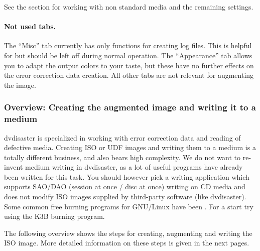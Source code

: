 See the  section
for working with non standard media and the remaining settings. 

\paragraph{Not used tabs.} The ``Misc'' tab currently has only
functions for creating log files. This is helpful for
but should be left off during normal operation.
The ``Appearance'' tab allows you to adapt the output colors
to your taste, but these have no further effects on the error correction data creation.
All other tabs are not relevant for augmenting the image.
 
\subsubsection{Overview: Creating the augmented image and writing it to a medium}
\label{howto-augment-overview}

dvdisaster is specialized in working with error correction data and reading
of defective media. Creating ISO or UDF images and writing them to a medium
is a totally different business, and also bears high complexity. We do not
want to re-invent medium writing in dvdisaster, as a lot of useful programs
have already been written for this task. You should however pick a writing
application which supports SAO/DAO (session at once / disc at once) writing
on CD media and does not modify ISO images supplied by third-party software
(like dvdisaster). Some common free burning programs for GNU/Linux have been
.
For a start try using the K3B burning program.

\bigskip

The following overview shows the steps for creating, augmenting and writing the
ISO image. More detailed information on these steps is given in the next pages.

\medskip

